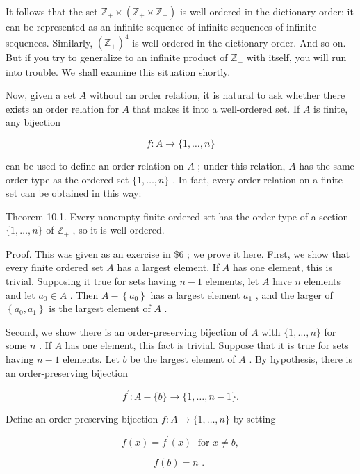 It follows that the set \({\mathbb{Z}}_{ + } \times  \left( {{\mathbb{Z}}_{ + } \times  {\mathbb{Z}}_{ + }}\right)\) is well-ordered in the dictionary order; it can be represented as an infinite sequence of infinite sequences of infinite sequences. Similarly, \({\left( {\mathbb{Z}}_{ + }\right) }^{4}\) is well-ordered in the dictionary order. And so on. But if you try to generalize to an infinite product of \({\mathbb{Z}}_{ + }\) with itself, you will run into trouble. We shall examine this situation shortly.

Now, given a set \(A\) without an order relation, it is natural to ask whether there exists an order relation for \(A\) that makes it into a well-ordered set. If \(A\) is finite, any bijection

\[
f : A \rightarrow  \{ 1,\ldots ,n\}
\]

can be used to define an order relation on \(A\) ; under this relation, \(A\) has the same order type as the ordered set \(\{ 1,\ldots ,n\}\) . In fact, every order relation on a finite set can be obtained in this way:

Theorem 10.1. Every nonempty finite ordered set has the order type of a section \(\{ 1,\ldots ,n\}\) of \({\mathbb{Z}}_{ + }\) , so it is well-ordered.

Proof. This was given as an exercise in \(\$ 6\) ; we prove it here. First, we show that every finite ordered set \(A\) has a largest element. If \(A\) has one element, this is trivial. Supposing it true for sets having \(n - 1\) elements, let \(A\) have \(n\) elements and let \({a}_{0} \in  A\) . Then \(A - \left\{  {a}_{0}\right\}\) has a largest element \({a}_{1}\) , and the larger of \(\left\{  {{a}_{0},{a}_{1}}\right\}\) is the largest element of \(A\) .

Second, we show there is an order-preserving bijection of \(A\) with \(\{ 1,\ldots ,n\}\) for some \(n\) . If \(A\) has one element, this fact is trivial. Suppose that it is true for sets having \(n - 1\) elements. Let \(b\) be the largest element of \(A\) . By hypothesis, there is an order-preserving bijection

\[
{f}^{\prime } : A - \{ b\}  \rightarrow  \{ 1,\ldots ,n - 1\} .
\]

Define an order-preserving bijection \(f : A \rightarrow  \{ 1,\ldots ,n\}\) by setting

\[
f\left( x\right)  = {f}^{\prime }\left( x\right) \;\text{ for }x \neq  b,
\]

\[
f\left( b\right)  = n\text{ . }
\]

